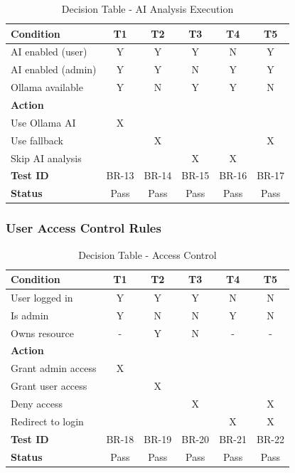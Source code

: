 \documentclass[12pt,a4paper]{article}
\begin{document}
    \begin{table}[H]
        \caption{Decision Table - AI Analysis Execution}
        \begin{tabular}{|l|c|c|c|c|c|}
            \hline
            \textbf{Condition} & \textbf{T1} & \textbf{T2} & \textbf{T3} & \textbf{T4} & \textbf{T5} \\
            \hline
            AI enabled (user) & Y & Y & Y & N & Y \\
            AI enabled (admin) & Y & Y & N & Y & Y \\
            Ollama available & Y & N & Y & Y & N \\
            \hline
            \textbf{Action} & & & & & \\
            \hline
            Use Ollama AI & X & & & & \\
            Use fallback & & X & & & X \\
            Skip AI analysis & & & X & X & \\
            \hline
            \textbf{Test ID} & BR-13 & BR-14 & BR-15 & BR-16 & BR-17 \\
            \textbf{Status} & Pass & Pass & Pass & Pass & Pass \\
            \hline
        \end{tabular}
    \end{table}

    \subsubsection{User Access Control Rules}

    \begin{table}[H]
        \caption{Decision Table - Access Control}
        \begin{tabular}{|l|c|c|c|c|c|}
            \hline
            \textbf{Condition} & \textbf{T1} & \textbf{T2} & \textbf{T3} & \textbf{T4} & \textbf{T5} \\
            \hline
            User logged in & Y & Y & Y & N & N \\
            Is admin & Y & N & N & Y & N \\
            Owns resource & - & Y & N & - & - \\
            \hline
            \textbf{Action} & & & & & \\
            \hline
            Grant admin access & X & & & & \\
            Grant user access & & X & & & \\
            Deny access & & & X & & X \\
            Redirect to login & & & & X & X \\
            \hline
            \textbf{Test ID} & BR-18 & BR-19 & BR-20 & BR-21 & BR-22 \\
            \textbf{Status} & Pass & Pass & Pass & Pass & Pass \\
            \hline
        \end{tabular}
    \end{table}
\end{document}
